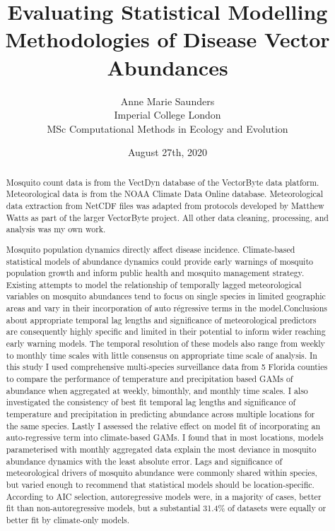 \documentclass[11pt, a4paper]{report}
\title{Evaluating Statistical Modelling Methodologies of Disease Vector Abundances }
\author{Anne Marie Saunders\\
Imperial College London\\
MSc Computational Methods in Ecology and Evolution\\}
\date{August 27th, 2020\\ 
}
\begin{document}

\begin{titlepage}
	\maketitle
\end{titlepage}


\renewcommand{\abstractname}{Declaration}
\begin{abstract}
Mosquito count data is from the VectDyn database of the VectorByte data platform. Meteorological data is from the NOAA Climate Data Online database. Meteorological data extraction from NetCDF files was adapted from protocols developed by Matthew Watts as part of the larger VectorByte project. All other data cleaning, processing, and analysis was my own work.
\end{abstract}

\renewcommand{\abstractname}{Abstract}
\begin{abstract}
Mosquito population dynamics directly affect disease incidence. Climate-based statistical models of abundance dynamics could provide early warnings of mosquito population growth and inform public health and mosquito management strategy. Existing attempts to model the relationship of temporally lagged meteorological variables on mosquito abundances tend to focus on single species in limited geographic areas and vary in their incorporation of auto régressive terms in the model.Conclusions about appropriate temporal  lag lengths and significance of meteorological predictors are consequently highly specific and limited in their potential to inform wider reaching early warning models. The temporal resolution of these models also range from weekly to monthly time scales with little consensus on appropriate time scale of analysis. In this study I used comprehensive multi-species surveillance data from 5 Florida counties to compare the performance of temperature and precipitation based GAMs of abundance when aggregated at weekly, bimonthly, and monthly time scales. I also investigated the consistency of best fit temporal lag lengths and significance of temperature and precipitation in predicting abundance across multiple locations for the same species. Lastly I assessed the relative effect on model fit of incorporating an auto-regressive term into climate-based GAMs. I found that in most locations, models parameterised with monthly aggregated data explain the most deviance in mosquito abundance dynamics with the least absolute error. Lags and significance of meteorological drivers of mosquito abundance were commonly shared within species, but varied enough to recommend that statistical models should be location-specific. According to AIC selection, autoregressive models were, in a majority of cases, better fit than non-autoregressive models, but a substantial 31.4\% of datasets were equally or better fit by climate-only models.
\end{abstract}
\end{document}
